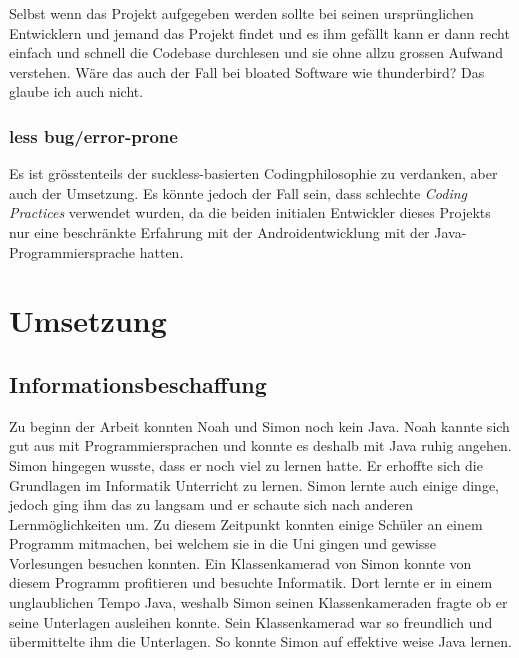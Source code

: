 \documentclass[a4paper,11pt]{article}
\begin{document}
Selbst wenn das Projekt aufgegeben werden sollte bei seinen ursprünglichen Entwicklern und jemand das Projekt findet und es ihm gefällt kann er dann recht einfach und schnell die Codebase durchlesen und sie ohne allzu grossen Aufwand verstehen. Wäre das auch der Fall bei bloated Software wie thunderbird? Das glaube ich auch nicht.

\subsubsection{less bug/error-prone}
Es ist grösstenteils der suckless-basierten Codingphilosophie zu verdanken, aber auch der Umsetzung. Es könnte jedoch der Fall sein, dass schlechte \textit{Coding Practices} verwendet wurden, da die beiden initialen Entwickler dieses Projekts nur eine beschränkte Erfahrung mit der Androidentwicklung mit der Java-Programmiersprache hatten.

\section{Umsetzung}

\subsection{Informationsbeschaffung}

Zu beginn der Arbeit konnten Noah und Simon noch kein Java. Noah kannte sich gut aus mit Programmiersprachen und konnte es deshalb mit Java ruhig angehen.
Simon hingegen wusste, dass er noch viel zu lernen hatte. Er erhoffte sich die Grundlagen im Informatik Unterricht zu lernen. 
Simon lernte auch einige dinge, jedoch ging ihm das zu langsam und er schaute sich nach anderen Lernmöglichkeiten um. 
Zu diesem Zeitpunkt konnten einige Schüler an einem Programm mitmachen, bei welchem sie in die Uni gingen und gewisse 
Vorlesungen besuchen konnten. Ein Klassenkamerad von Simon konnte von diesem Programm profitieren und besuchte Informatik. 
Dort lernte er in einem unglaublichen Tempo Java, weshalb Simon seinen Klassenkameraden fragte ob er seine Unterlagen ausleihen konnte. 
Sein Klassenkamerad war so freundlich und übermittelte ihm die Unterlagen. So konnte Simon auf effektive weise Java lernen. \\
\end{document}
